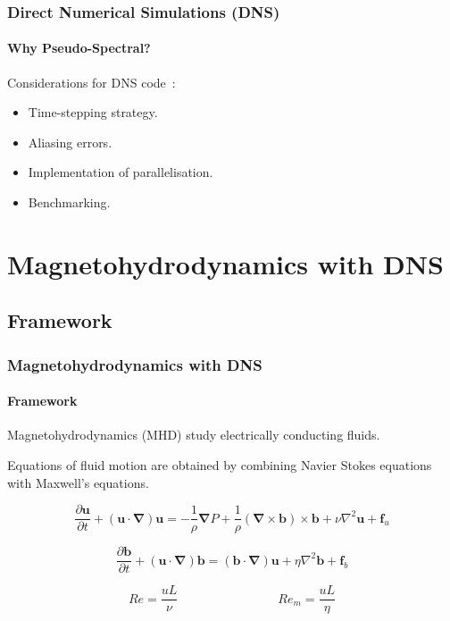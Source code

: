 \documentclass{beamer}
\begin{document}
\begin{frame}
 \frametitle{Direct Numerical Simulations (DNS)}
 \framesubtitle{Why Pseudo-Spectral?}
 
 Considerations for DNS code~\cite{yoffe2013investigation}:
 
 \begin{itemize}
  \item<2-> Time-stepping strategy.
  \item<3-> Aliasing errors.
  \item<4-> Implementation of parallelisation.
  \item<5-> Benchmarking.
 \end{itemize}


\end{frame}


\section{Magnetohydrodynamics with DNS}

\subsection{Framework}

\begin{frame}
 \frametitle{Magnetohydrodynamics with DNS}
 \framesubtitle{Framework}
 
 Magnetohydrodynamics (MHD) study electrically conducting fluids. \pause
 
 Equations of fluid motion are obtained by combining Navier Stokes equations with Maxwell's equations.
 
 \begin{equation}
  \frac{\partial \bm u}{\partial t} + (\bm u \cdot \bm \nabla) \bm u = - \frac{1}{\rho} \bm \nabla P + \frac{1}{\rho} (\bm \nabla \times \bm b) \times \bm b + \nu \nabla ^ 2 \bm u + \bm f_u
 \end{equation} %
 
 \begin{equation}
  \frac{\partial \bm b}{\partial t} + (\bm u \cdot \bm \nabla) \bm b = (\bm b \cdot \bm \nabla) \bm u + \eta \nabla ^ 2 \bm b + \bm f_b
 \end{equation} \pause
 
 \begin{equation}
  Re = \frac{u L}{\nu} \qquad \qquad \qquad \qquad Re_m = \frac{u L}{\eta}
 \end{equation}


\end{frame}
\end{document}
